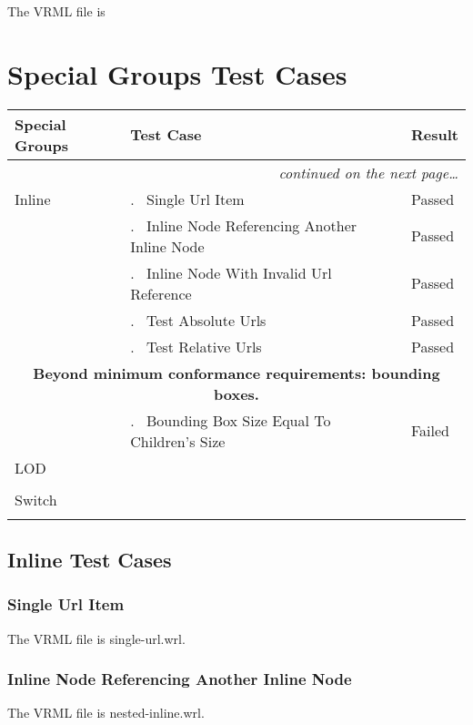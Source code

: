 \documentclass[12pt,letterpaper]{article}
\newcounter{testCaseCtr}
\newcommand{\testCase}{\arabic{testCaseCtr}.~ \stepcounter{testCaseCtr}}
\newcommand{\resetTestCase}{\setcounter{testCaseCtr}{1}}
\newcommand{\SpGrA}{Single Url Item}
\newcommand{\SpGrB}{Inline Node Referencing Another Inline Node}
\newcommand{\SpGrC}{Inline Node With Invalid Url Reference}
\newcommand{\SpGrD}{Test Absolute Urls}
\newcommand{\SpGrE}{Test Relative Urls}
\newcommand{\SpGrF}{Bounding Box Size Equal To Children's Size}
\begin{document}
\subsubsection{}
The VRML file is 

\section{Special Groups Test Cases}
\resetTestCase

\begin{center}
\setlongtables
\begin{longtable}{|l|l|l|}
\hline
\textbf{Special Groups} & \textbf{Test Case} & \textbf{Result} \\
\hline\hline
\endhead
 & \multicolumn{2}{|r|}{\textsl{continued on the next page\ldots}} \\
\hline
\endfoot
\hline
\endlastfoot
Inline & \testCase \SpGrA & Passed \\\cline{2-3}
& \testCase \SpGrB & Passed \\\cline{2-3}
& \testCase \SpGrC & Passed \\\cline{2-3}
& \testCase \SpGrD & Passed \\\cline{2-3}
& \testCase \SpGrE & Passed \\\hline
\multicolumn{3}{|c|}{\textbf{Beyond minimum conformance requirements:
bounding boxes.}} \\\hline
& \testCase \SpGrF & Failed \\\hline
\resetTestCase
LOD & & \\\cline{2-3}
& & \\\hline
\resetTestCase
Switch & & \\\cline{2-3}
& & \\
\end{longtable}
\end{center}

\subsection{Inline Test Cases}

\subsubsection{\SpGrA}
The VRML file is single-url.wrl.

\subsubsection{\SpGrB}
The VRML file is nested-inline.wrl.
\end{document}
